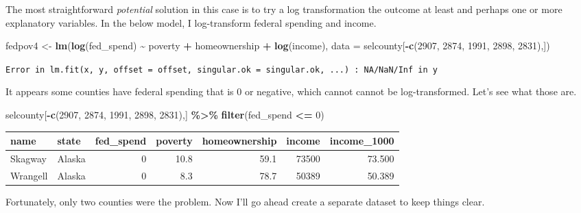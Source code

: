 \documentclass[
]{book}
\makeatletter
\newenvironment{Shaded}{\begin{snugshade}}{\end{snugshade}}
\newcommand{\AttributeTok}[1]{\textcolor[rgb]{0.27,0.27,0.27}{#1}}
\newcommand{\DecValTok}[1]{\textcolor[rgb]{0.06,0.06,0.06}{#1}}
\newcommand{\FunctionTok}[1]{\textcolor[rgb]{0.27,0.27,0.27}{\textbf{#1}}}
\newcommand{\NormalTok}[1]{#1}
\newcommand{\OtherTok}[1]{\textcolor[rgb]{0.37,0.37,0.37}{#1}}
\newcommand{\SpecialCharTok}[1]{\textcolor[rgb]{0.43,0.43,0.43}{\textbf{#1}}}
\newenvironment{kframe}{%
\medskip{}
\setlength{\fboxsep}{.8em}
 \def\at@end@of@kframe{}%
 \ifinner\ifhmode%
  \def\at@end@of@kframe{\end{minipage}}%
  \begin{minipage}{\columnwidth}%
 \fi\fi%
 \def\FrameCommand##1{\hskip\@totalleftmargin \hskip-\fboxsep
 \colorbox{shadecolor}{##1}\hskip-\fboxsep
     \hskip-\linewidth \hskip-\@totalleftmargin \hskip\columnwidth}%
 \MakeFramed {\advance\hsize-\width
   \@totalleftmargin\z@ \linewidth\hsize
   \@setminipage}}%
 {\par\unskip\endMakeFramed%
 \at@end@of@kframe}
\renewenvironment{Shaded}{\begin{kframe}}{\end{kframe}}
\makeatother
\begin{document}
The most straightforward \emph{potential} solution in this case is to try a log transformation the outcome at least and perhaps one or more explanatory variables. In the below model, I log-transform federal spending and income.

\begin{Shaded}
\begin{Highlighting}[]
\NormalTok{fedpov4 }\OtherTok{\textless{}{-}} \FunctionTok{lm}\NormalTok{(}\FunctionTok{log}\NormalTok{(fed\_spend) }\SpecialCharTok{\textasciitilde{}}\NormalTok{ poverty }\SpecialCharTok{+}\NormalTok{ homeownership }\SpecialCharTok{+} \FunctionTok{log}\NormalTok{(income), }
              \AttributeTok{data =}\NormalTok{ selcounty[}\SpecialCharTok{{-}}\FunctionTok{c}\NormalTok{(}\DecValTok{2907}\NormalTok{, }\DecValTok{2874}\NormalTok{, }\DecValTok{1991}\NormalTok{, }\DecValTok{2898}\NormalTok{, }\DecValTok{2831}\NormalTok{),])}
\end{Highlighting}
\end{Shaded}

\texttt{Error\ in\ lm.fit(x,\ y,\ offset\ =\ offset,\ singular.ok\ =\ singular.ok,\ ...)\ :\ NA/NaN/Inf\ in\ \textquotesingle{}y\textquotesingle{}}

It appears some counties have federal spending that is 0 or negative, which cannot cannot be log-transformed. Let's see what those are.

\begin{Shaded}
\begin{Highlighting}[]
\NormalTok{selcounty[}\SpecialCharTok{{-}}\FunctionTok{c}\NormalTok{(}\DecValTok{2907}\NormalTok{, }\DecValTok{2874}\NormalTok{, }\DecValTok{1991}\NormalTok{, }\DecValTok{2898}\NormalTok{, }\DecValTok{2831}\NormalTok{),] }\SpecialCharTok{\%\textgreater{}\%} 
  \FunctionTok{filter}\NormalTok{(fed\_spend }\SpecialCharTok{\textless{}=} \DecValTok{0}\NormalTok{)}
\end{Highlighting}
\end{Shaded}

\begin{tabular}{l|l|r|r|r|r|r}
\hline
name & state & fed\_spend & poverty & homeownership & income & income\_1000\\
\hline
Skagway & Alaska & 0 & 10.8 & 59.1 & 73500 & 73.500\\
\hline
Wrangell & Alaska & 0 & 8.3 & 78.7 & 50389 & 50.389\\
\hline
\end{tabular}

Fortunately, only two counties were the problem. Now I'll go ahead create a separate dataset to keep things clear.
\end{document}
